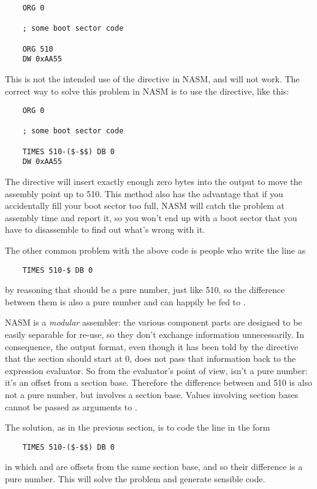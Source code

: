 \begin{lstlisting}
    ORG 0

    ; some boot sector code

    ORG 510
    DW 0xAA55
\end{lstlisting}

This is not the intended use of the  directive in NASM, and
will not work. The correct way to solve this problem in NASM is to
use the  directive, like this:

\begin{lstlisting}
    ORG 0

    ; some boot sector code

    TIMES 510-($-$$) DB 0
    DW 0xAA55
\end{lstlisting}

The  directive will insert exactly enough zero bytes into
the output to move the assembly point up to 510. This method also
has the advantage that if you accidentally fill your boot sector too
full, NASM will catch the problem at assembly time and report it, so
you won't end up with a boot sector that you have to disassemble to
find out what's wrong with it.


The other common problem with the above code is people who write the
 line as

\begin{lstlisting}
    TIMES 510-$ DB 0
\end{lstlisting}

by reasoning that \code{\$} should be a pure number, just like 510, so
the difference between them is also a pure number and can happily be
fed to .

NASM is a \emph{modular} assembler: the various component parts are
designed to be easily separable for re-use, so they don't exchange
information unnecessarily. In consequence, the  output
format, even though it has been told by the  directive that
the  section should start at 0, does not pass that
information back to the expression evaluator. So from the
evaluator's point of view, \code{\$} isn't a pure number: it's an offset
from a section base. Therefore the difference between \code{\$} and 510
is also not a pure number, but involves a section base. Values
involving section bases cannot be passed as arguments to .

The solution, as in the previous section, is to code the 
line in the form

\begin{lstlisting}
    TIMES 510-($-$$) DB 0
\end{lstlisting}

in which \code{\$} and \code{\$\$} are offsets from the same section base,
and so their difference is a pure number. This will solve the
problem and generate sensible code.
